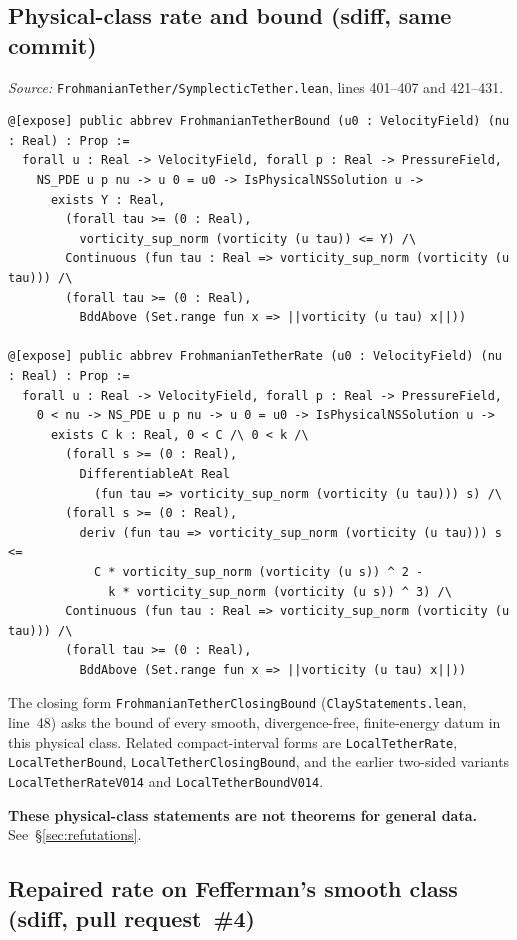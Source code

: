 \documentclass[11pt]{article}
\theoremstyle{plain}
\theoremstyle{definition}
\theoremstyle{remark}
\begin{document}
\subsection{Physical-class rate and bound (sdiff, same commit)}

\textit{Source:} \texttt{FrohmanianTether/\hspace{0pt}SymplecticTether.\hspace{0pt}lean}, lines 401--407 and 421--431.
\begin{lstlisting}
@[expose] public abbrev FrohmanianTetherBound (u0 : VelocityField) (nu : Real) : Prop :=
  forall u : Real -> VelocityField, forall p : Real -> PressureField,
    NS_PDE u p nu -> u 0 = u0 -> IsPhysicalNSSolution u ->
      exists Y : Real,
        (forall tau >= (0 : Real),
          vorticity_sup_norm (vorticity (u tau)) <= Y) /\
        Continuous (fun tau : Real => vorticity_sup_norm (vorticity (u tau))) /\
        (forall tau >= (0 : Real),
          BddAbove (Set.range fun x => ||vorticity (u tau) x||))

@[expose] public abbrev FrohmanianTetherRate (u0 : VelocityField) (nu : Real) : Prop :=
  forall u : Real -> VelocityField, forall p : Real -> PressureField,
    0 < nu -> NS_PDE u p nu -> u 0 = u0 -> IsPhysicalNSSolution u ->
      exists C k : Real, 0 < C /\ 0 < k /\
        (forall s >= (0 : Real),
          DifferentiableAt Real
            (fun tau => vorticity_sup_norm (vorticity (u tau))) s) /\
        (forall s >= (0 : Real),
          deriv (fun tau => vorticity_sup_norm (vorticity (u tau))) s <=
            C * vorticity_sup_norm (vorticity (u s)) ^ 2 -
              k * vorticity_sup_norm (vorticity (u s)) ^ 3) /\
        Continuous (fun tau : Real => vorticity_sup_norm (vorticity (u tau))) /\
        (forall tau >= (0 : Real),
          BddAbove (Set.range fun x => ||vorticity (u tau) x||))
\end{lstlisting}
The closing form \texttt{FrohmanianTetherClosingBound} (\texttt{ClayStatements.\hspace{0pt}lean}, line~48) asks the bound of every smooth, divergence-free, finite-energy datum in this physical class. Related compact-interval forms are \texttt{LocalTetherRate}, \texttt{LocalTetherBound}, \texttt{LocalTetherClosingBound}, and the earlier two-sided variants \texttt{LocalTetherRateV014} and \texttt{LocalTetherBoundV014}.

\textbf{These physical-class statements are not theorems for general data.} See~\S\ref{sec:refutations}.

\subsection{Repaired rate on Fefferman's smooth class (sdiff, pull request~\#4)}
\label{sec:rate-smooth}
\end{document}
